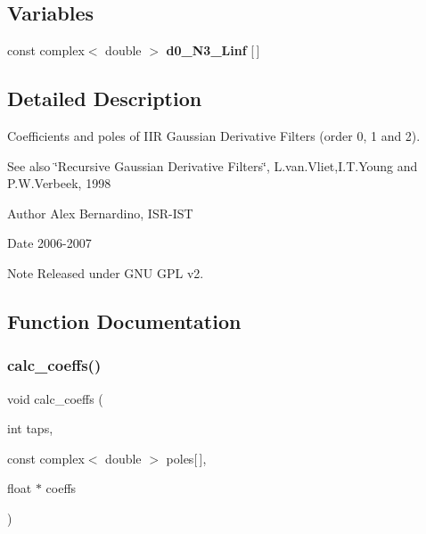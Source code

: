 \subsection*{Variables}
\begin{DoxyCompactItemize}
\item 
const complex$<$ double $>$ {\bfseries d0\+\_\+\+N3\+\_\+\+Linf} \mbox{[}$\,$\mbox{]}
\end{DoxyCompactItemize}


\subsection{Detailed Description}
Coefficients and poles of I\+IR Gaussian Derivative Filters (order 0, 1 and 2). 

\begin{DoxySeeAlso}{See also}
\char`\"{}\+Recursive Gaussian Derivative Filters\char`\"{}, L.\+van.\+Vliet,I.\+T.\+Young and P.\+W.\+Verbeek, 1998 
\end{DoxySeeAlso}
\begin{DoxyAuthor}{Author}
Alex Bernardino, I\+S\+R-\/\+I\+ST 
\end{DoxyAuthor}
\begin{DoxyDate}{Date}
2006-\/2007 
\end{DoxyDate}
\begin{DoxyNote}{Note}
Released under G\+NU G\+PL v2. 
\end{DoxyNote}


\subsection{Function Documentation}
\mbox{\label{IIRGausDeriv_8cpp_a3e7f009d38086e228c6ba8b3e5b6055f}} 
\subsubsection{\texorpdfstring{calc\+\_\+coeffs()}{calc\_coeffs()}\hspace{0.1cm}{\footnotesize\ttfamily [1/2]}}
{\footnotesize\ttfamily void calc\+\_\+coeffs (\begin{DoxyParamCaption}\item[{int}]{taps,  }\item[{const complex$<$ double $>$}]{poles\mbox{[}$\,$\mbox{]},  }\item[{float $\ast$}]{coeffs }\end{DoxyParamCaption})}



